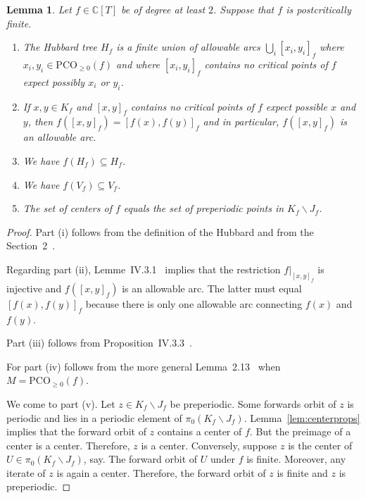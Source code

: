 \documentclass[12pt,oneside,a4]{amsart}
\newcommand{\IC}{\mathbb{C}}
\newcounter{maincounter}
\numberwithin{maincounter}{section}
\numberwithin{equation}{section}
\newtheorem{lemma}[maincounter]{Lemma}
\renewcommand{\subset}{\subseteq}
\newcommand{\ssm}{\smallsetminus}
\newcommand{\pco}{\mathrm{PCO}}
\begin{document}
\begin{lemma}
  \label{lem:hubbardbasic}
  Let $f\in\IC[T]$ be of degree at least $2$. Suppose that $f$ is
  postcritically finite.
  \begin{enumerate}
  \item [(i)] The Hubbard tree $H_f$ is a finite union of allowable
    arcs $\bigcup_i [x_i,y_i]_f$ where $x_i,y_i\in \pco_{\ge 0}(f)$ and where $[x_i,y_i]_f$
    contains no critical points of $f$ expect possibly $x_i$ or
    $y_i$. 
  \item[(ii)] If $x,y\in K_f$ and $[x,y]_f$ contains no critical points
    of $f$ expect possible $x$ and $y$, then
    $f([x,y]_f)=[f(x),f(y)]_f$
    and in particular, $f([x,y]_f)$ is an allowable arc.
  \item [(iii)] We have $f(H_f)\subset H_f$.
  \item[(iv)] We have $f(V_f) \subset V_f$.
  \item[(v)] The set of centers of $f$ equals  the set of
    preperiodic points in $K_f\ssm J_f$. 
  \end{enumerate}
\end{lemma}
\begin{proof}
  Part (i) follows from the definition of the Hubbard and from the
  Section~2~\cite{poirier:hubbardtrees}.

  Regarding part (ii), 
  Lemme~IV.3.1~\cite{DH:etudedynI} implies that the restriction
  $f|_{[x,y]_f}$ is injective and $f([x,y]_f)$ is
  an allowable arc. The latter must equal $[f(x),f(y)]_f$ because
  there is only one allowable arc connecting $f(x)$ and $f(y)$. 
  
  Part (iii) follows from Proposition~IV.3.3~\cite{DH:etudedynI}.

  For part (iv) follows from the more general
  Lemma~2.13~\cite{poirier:hubbardtrees} when $M=\mathrm{PCO}_{\ge
    0}(f)$.
  
  We come to part (v). Let $z\in K_f\ssm J_f$ be preperiodic.
  Some forwards orbit of $z$ is periodic and lies in a periodic element of
  $\pi_0(K_f\ssm J_f)$.  
  Lemma~\ref{lem:centerprops} implies that the
  forward orbit of $z$ contains a center of $f$. 
  But the preimage of a center is a center. Therefore, $z$ is a center. 
  Conversely,
  suppose $z$ is the center of $U\in\pi_0(K_f\ssm J_f)$, say.
  The forward orbit of $U$ under $f$ is
  finite. Moreover, any iterate of $z$ is again a center. Therefore,
  the forward orbit of $z$ is finite and $z$ is preperiodic. 
\end{proof}
\end{document}
